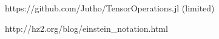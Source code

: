 
https://github.com/Jutho/TensorOperations.jl
  (limited)

http://hz2.org/blog/einstein_notation.html
